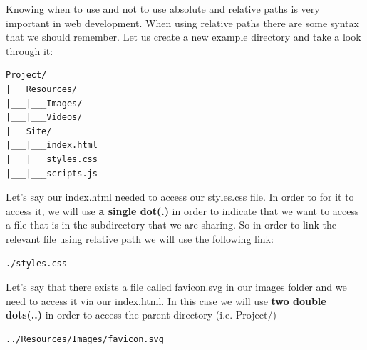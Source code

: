 \documentclass[11pt]{article}
\begin{document}
Knowing when to use and not to use absolute and relative paths is very important in web development.
When using relative paths there are some syntax that we should remember. Let us create a new example
directory and take a look through it:
\begin{verbatim}
Project/
|___Resources/
|___|___Images/
|___|___Videos/
|___Site/
|___|___index.html
|___|___styles.css
|___|___scripts.js
\end{verbatim}
Let's say our index.html needed to access our styles.css file. In order to for it to access it, we
will use \textbf{a single dot(.)} in order to indicate that we want to access a file that is in the
subdirectory that we are sharing. So in order to link the relevant file using relative path we will
use the following link:
\begin{verbatim}
./styles.css
\end{verbatim}
Let's say that there exists a file called favicon.svg in our images folder and we need to access it
via our index.html. In this case we will use \textbf{two double dots(..)} in order to access the parent
directory (i.e. Project/)
\begin{verbatim}
../Resources/Images/favicon.svg
\end{verbatim}
\end{document}

